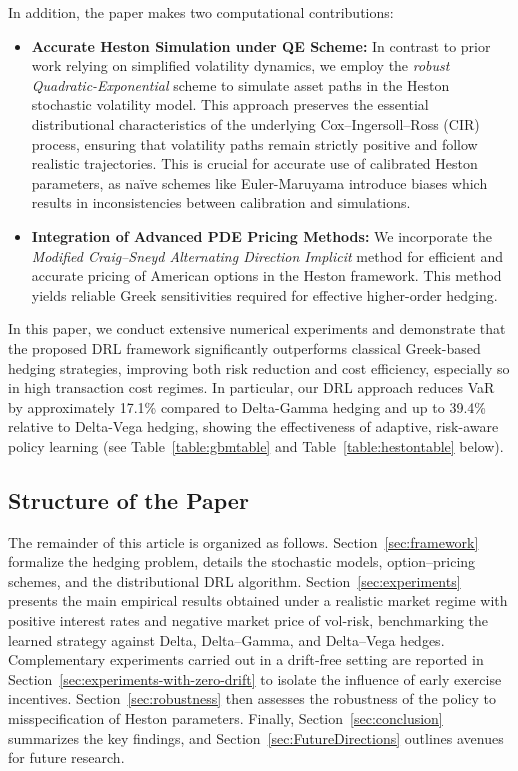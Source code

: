 \documentclass[a4paper,fleqn]{cas-dc}
\begin{document}
\vspace{0.5em}
\noindent In addition, the paper makes two computational contributions:

\begin{itemize}[noitemsep, left=4pt]
    \item \textbf{Accurate Heston Simulation under QE Scheme:} In contrast to prior work relying on simplified volatility dynamics, we employ the \emph{robust Quadratic-Exponential} scheme \cite{heston_sim} to simulate asset paths in the Heston stochastic volatility model. This approach preserves the essential distributional characteristics of the underlying Cox--Ingersoll--Ross (CIR) process, ensuring that volatility paths remain strictly positive and follow realistic trajectories. This is crucial for accurate use of calibrated Heston parameters, as na\"{i}ve schemes like Euler-Maruyama introduce biases which results in inconsistencies between calibration and simulations.
    \item \textbf{Integration of Advanced PDE Pricing Methods:} We incorporate the \emph{Modified Craig--Sneyd Alternating Direction Implicit} method \cite{MCS_og} for efficient and accurate pricing of American options in the Heston framework. This method yields reliable Greek sensitivities required for effective higher-order hedging.
\end{itemize}

\vspace{0.5em}
\noindent In this paper, we conduct extensive numerical experiments and demonstrate that the proposed DRL framework significantly outperforms classical Greek-based hedging strategies, improving both risk reduction and cost efficiency, especially so in high transaction cost regimes. In particular, our DRL approach reduces VaR by approximately 17.1\% compared to Delta-Gamma hedging and up to 39.4\% relative to Delta-Vega hedging, showing the effectiveness of adaptive, risk-aware policy learning (see Table~\ref{table:gbmtable} and Table~\ref{table:hestontable} below).

\subsection{Structure of the Paper}
\label{sec:structure}

The remainder of this article is organized as follows. Section~\ref{sec:framework} formalize the hedging problem, details the stochastic models, option–pricing schemes, and the distributional DRL algorithm. Section~\ref{sec:experiments} presents the main empirical results obtained under a realistic market regime with positive interest rates and negative market price of vol-risk, benchmarking the learned strategy against Delta, Delta–Gamma, and Delta–Vega hedges. Complementary experiments carried out in a drift‑free setting are reported in Section~\ref{sec:experiments-with-zero-drift} to isolate the influence of early exercise incentives. Section~\ref{sec:robustness} then assesses the robustness of the policy to misspecification of Heston parameters. Finally, Section~\ref{sec:conclusion} summarizes the key findings, and Section~\ref{sec:FutureDirections} outlines avenues for future research.
\end{document}
